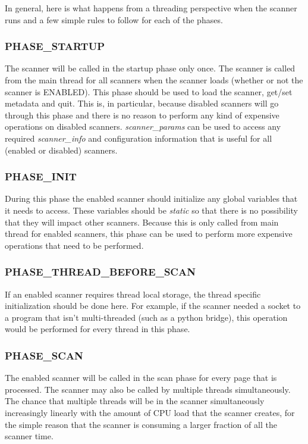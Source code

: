 \documentclass[11pt,fleqn]{article} %
\begin{document}
In general, here is what happens from a threading perspective when the scanner runs and a few simple rules to follow for each of the phases.

\subsubsection{PHASE\_STARTUP}

The scanner will be called in the startup phase only once. The scanner is called from the main thread for all scanners when the scanner loads (whether or not the scanner is ENABLED).  This phase should be used to load the scanner, get/set metadata and quit. This is, in particular, because disabled scanners will go through this phase and there is no reason to perform any kind of expensive operations on disabled scanners. \textit{scanner\_params} can be used to access any required \textit{scanner\_info} and configuration information that is useful for all (enabled or disabled) scanners.

\subsubsection{PHASE\_INIT}
During this phase the enabled scanner should initialize any global variables that it needs to access. These variables should be \emph{static} so that there is no possibility that they will impact other scanners. Because this is only called from main thread for enabled scanners, this phase can be used to perform more expensive operations that need to be performed. 

\subsubsection{PHASE\_THREAD\_BEFORE\_SCAN}
If an enabled scanner requires thread local storage, the thread specific initialization should be done here. For example, if the scanner needed a socket to a program that isn't multi-threaded (such as a python bridge), this operation would be performed for every thread in this phase.

\subsubsection{PHASE\_SCAN}
The enabled scanner will be called in the scan phase for every page that is processed. The scanner may also be called by multiple threads simultaneously. The chance that multiple threads will be in the scanner simultaneously increasingly linearly with the amount of CPU load that the scanner creates, for the simple reason that the scanner is consuming a larger fraction of all the scanner time.\\ 
\end{document}
